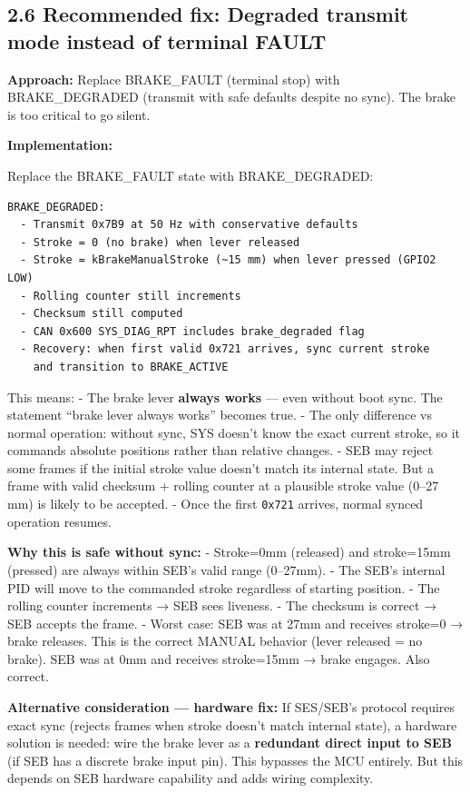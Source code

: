 \documentclass[12pt,a4paper,oneside]{report}
\begin{document}
\subsection{2.6 Recommended fix: Degraded transmit mode instead of terminal
FAULT}\label{recommended-fix-degraded-transmit-mode-instead-of-terminal-fault}

\textbf{Approach:} Replace BRAKE\_FAULT (terminal stop) with BRAKE\_DEGRADED
(transmit with safe defaults despite no sync). The brake is too critical to go
silent.

\textbf{Implementation:}

Replace the BRAKE\_FAULT state with BRAKE\_DEGRADED:

\begin{verbatim}
BRAKE_DEGRADED:
  - Transmit 0x7B9 at 50 Hz with conservative defaults
  - Stroke = 0 (no brake) when lever released
  - Stroke = kBrakeManualStroke (~15 mm) when lever pressed (GPIO2 LOW)
  - Rolling counter still increments
  - Checksum still computed
  - CAN 0x600 SYS_DIAG_RPT includes brake_degraded flag
  - Recovery: when first valid 0x721 arrives, sync current stroke
    and transition to BRAKE_ACTIVE
\end{verbatim}

This means: - The brake lever \textbf{always works} --- even without boot sync.
The statement ``brake lever always works'' becomes true. - The only difference
vs normal operation: without sync, SYS doesn't know the exact current stroke, so
it commands absolute positions rather than relative changes. - SEB may reject
some frames if the initial stroke value doesn't match its internal state. But a
frame with valid checksum + rolling counter at a plausible stroke value (0--27
mm) is likely to be accepted. - Once the first \texttt{0x721} arrives, normal
synced operation resumes.

\textbf{Why this is safe without sync:} - Stroke=0mm (released) and stroke=15mm
(pressed) are always within SEB's valid range (0--27mm). - The SEB's internal
PID will move to the commanded stroke regardless of starting position. - The
rolling counter increments → SEB sees liveness. - The checksum is correct → SEB
accepts the frame. - Worst case: SEB was at 27mm and receives stroke=0 → brake
releases. This is the correct MANUAL behavior (lever released = no brake). SEB
was at 0mm and receives stroke=15mm → brake engages. Also correct.

\textbf{Alternative consideration --- hardware fix:} If SES/SEB's protocol
requires exact sync (rejects frames when stroke doesn't match internal state), a
hardware solution is needed: wire the brake lever as a \textbf{redundant direct
input to SEB} (if SEB has a discrete brake input pin). This bypasses the MCU
entirely. But this depends on SEB hardware capability and adds wiring
complexity.
\end{document}
